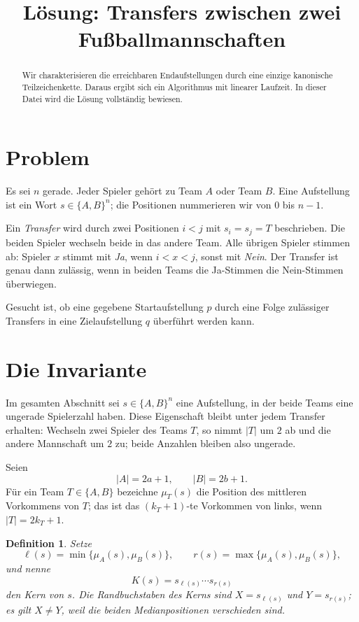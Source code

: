 \documentclass[11pt,a4paper]{article}
\title{L\"osung: Transfers zwischen zwei Fu\ss ballmannschaften}
\author{}
\date{}
\newtheorem{definition}[theorem]{Definition}
\begin{document}
\maketitle

\begin{abstract}
Wir charakterisieren die erreichbaren Endaufstellungen durch eine einzige
kanonische Teilzeichenkette.  Daraus ergibt sich ein Algorithmus mit
linearer Laufzeit.  In dieser Datei wird die L\"osung vollst\"andig
bewiesen.
\end{abstract}

\section{Problem}

Es sei $n$ gerade.  Jeder Spieler geh\"ort zu Team $A$ oder Team $B$.
Eine Aufstellung ist ein Wort $s\in\{A,B\}^n$; die Positionen nummerieren
wir von $0$ bis $n-1$.

Ein \emph{Transfer} wird durch zwei Positionen $i<j$ mit $s_i=s_j=T$
beschrieben.  Die beiden Spieler wechseln beide in das andere Team.
Alle \"ubrigen Spieler stimmen ab: Spieler $x$ stimmt mit \emph{Ja},
wenn $i<x<j$, sonst mit \emph{Nein}.  Der Transfer ist genau dann
zul\"assig, wenn in beiden Teams die Ja-Stimmen die Nein-Stimmen
\"uberwiegen.

Gesucht ist, ob eine gegebene Startaufstellung $p$ durch eine Folge
zul\"assiger Transfers in eine Zielaufstellung $q$ \"uberf\"uhrt werden
kann.

\section{Die Invariante}

Im gesamten Abschnitt sei $s\in\{A,B\}^n$ eine Aufstellung, in der beide
Teams eine ungerade Spielerzahl haben.  Diese Eigenschaft bleibt unter
jedem Transfer erhalten: Wechseln zwei Spieler des Teams $T$, so nimmt
$|T|$ um $2$ ab und die andere Mannschaft um $2$ zu; beide Anzahlen
bleiben also ungerade.

Seien
\[
|A|=2a+1,\qquad |B|=2b+1.
\]
F\"ur ein Team $T\in\{A,B\}$ bezeichne $\mu_T(s)$ die Position des
mittleren Vorkommens von $T$; das ist das $(k_T+1)$-te Vorkommen von
links, wenn $|T|=2k_T+1$.

\begin{definition}
Setze
\[
\ell(s)=\min\{\mu_A(s),\mu_B(s)\},
\qquad
r(s)=\max\{\mu_A(s),\mu_B(s)\},
\]
und nenne
\[
K(s)=s_{\ell(s)}\cdots s_{r(s)}
\]
den \emph{Kern} von $s$.  Die Randbuchstaben des Kerns sind
$X=s_{\ell(s)}$ und $Y=s_{r(s)}$; es gilt $X\ne Y$, weil die beiden
Medianpositionen verschieden sind.
\end{definition}
\end{document}
